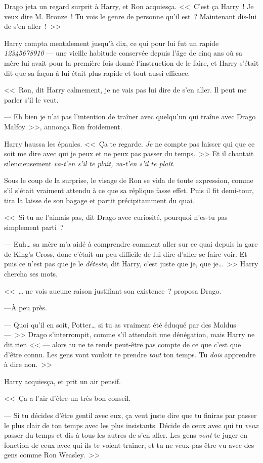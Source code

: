 Drago jeta un regard surprit à Harry, et Ron acquiesça. <<~C'est ça Harry~! Je veux dire M. Bronze~! Tu vois le genre de personne qu'il est~? Maintenant dis-lui de s'en aller~!~>>

Harry compta mentalement jusqu'à dix, ce qui pour lui fut un rapide \emph{12345678910} — une vieille habitude conservée depuis l'âge de cinq ans où sa mère lui avait pour la première fois donné l'instruction de le faire, et Harry s'était dit que sa façon à lui était plus rapide et tout aussi efficace.

<<~Ron, dit Harry calmement, je ne vais pas lui dire de s'en aller. Il peut me parler s'il le veut.

--- Eh bien je n'ai pas l'intention de traîner avec quelqu'un qui traîne avec Drago Malfoy~>>, annonça Ron froidement.

Harry haussa les épaules. <<~Ça te regarde. \emph{Je} ne compte pas laisser qui que ce soit me dire avec qui je peux et ne peux pas passer du temps.~>> Et il chantait silencieusement \emph{va-t'en s'il te plaît, va-t'en s'il te plaît}.

Sous le coup de la surprise, le visage de Ron se vida de toute expression, comme s'il s'était vraiment attendu à ce que sa réplique fasse effet. Puis il fit demi-tour, tira la laisse de son bagage et partit précipitamment du quai.

<<~Si tu ne l'aimais pas, dit Drago avec curiosité, pourquoi n'es-tu pas simplement parti~?

--- Euh… sa mère m'a aidé à comprendre comment aller sur ce quai depuis la gare de King's Cross, donc c'était un peu difficile de lui dire d'aller se faire voir. Et puis ce n'est pas que je le \emph{déteste}, dit Harry, c'est juste que je, que je…~>> Harry chercha ses mots.

<<~… ne vois aucune raison justifiant son existence~? proposa Drago.

---À peu près.

--- Quoi qu'il en soit, Potter… si tu as vraiment été éduqué par des Moldus —~>> Drago s'interrompit, comme s'il attendait une dénégation, mais Harry ne dit rien << — alors tu ne te rends peut-être pas compte de ce que c'est que d'être connu. Les gens vont vouloir te prendre \emph{tout} ton temps. Tu \emph{dois} apprendre à dire non.~>>

Harry acquiesça, et prit un air pensif.

<<~Ça a l'air d'être un très bon conseil.

--- Si tu décides d'être gentil avec eux, ça veut juste dire que tu finiras par passer le plus clair de ton temps avec les plus insistants. Décide de ceux avec qui tu \emph{veux} passer du temps et dis à tous les autres de s'en aller. Les gens \emph{vont} te juger en fonction de ceux avec qui ils te voient traîner, et tu ne veux pas être vu avec des gens comme Ron Weasley.~>>

